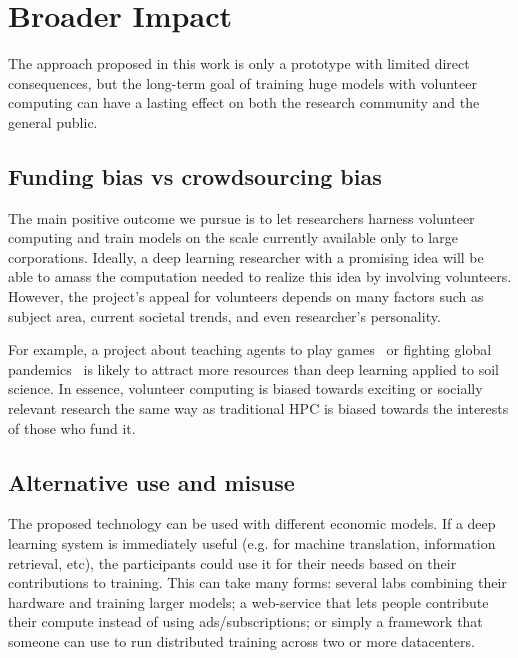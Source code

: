\section*{Broader Impact}
\label{sect:broader}
\vspace{-4px}

The approach proposed in this work is only a prototype with limited direct consequences, but the long-term goal of training huge models with volunteer computing can have a lasting effect on both the research community and the general public.

\vspace{-6px}
\subsection*{Funding bias vs crowdsourcing bias} 
\vspace{-6px}
The main positive outcome we pursue is to let researchers harness volunteer computing and train models on the scale currently available only to large corporations. Ideally, a deep learning researcher with a promising idea will be able to amass the computation needed to realize this idea by involving volunteers. However, the project's appeal for volunteers depends on many factors such as subject area, current societal trends, and even researcher's personality.

For example, a project about teaching agents to play games~\cite{lc0} or fighting global pandemics~\cite{folding_covid} is likely to attract more resources than deep learning applied to soil science. In essence, volunteer computing is biased towards exciting or socially relevant research the same way as traditional HPC is biased towards the interests of those who fund it.

\vspace{-6px}
\subsection*{Alternative use and misuse} 
\vspace{-6px}
The proposed technology can be used with different economic models. If a deep learning system is immediately useful (e.g. for machine translation, information retrieval, etc), the participants could use it for their needs based on their contributions to training. This can take many forms: several labs combining their hardware and training larger models; a web-service that lets people contribute their compute instead of using ads/subscriptions; or simply a framework that someone can use to run distributed training across two or more datacenters.


